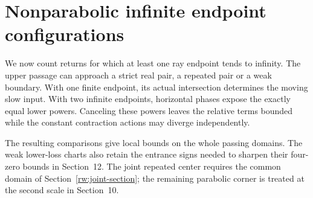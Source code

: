 \section{Nonparabolic infinite endpoint configurations}
\label{rw:infinity-local}

We now count returns for which at least one ray endpoint tends to
infinity. The upper passage can approach a strict real pair, a repeated
pair or a weak boundary. With one finite endpoint, its actual
intersection determines the moving slow input. With two infinite
endpoints, horizontal phases expose the exactly equal lower powers.
Canceling these powers leaves the relative terms bounded while the
constant contraction actions may diverge independently.

The resulting comparisons give local bounds on the whole passing
domains. The weak lower-loss charts also retain the entrance signs
needed to sharpen their four-zero bounds in Section~12. The joint
repeated center requires the common domain of
Section~\ref{rw:joint-section}; the remaining parabolic corner is
treated at the second scale in Section~10.



